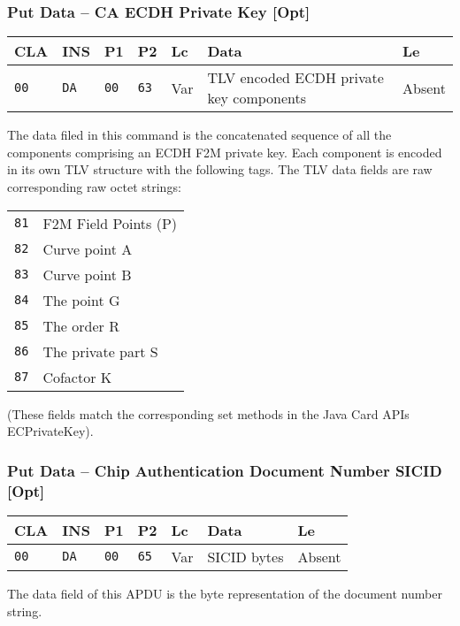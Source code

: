 \documentclass{article}
\begin{document}
\subsubsection{Put Data -- CA ECDH Private Key [Opt]}

\begin{flushleft}
\begin{tabular}{|l|l|l|l|l|l|l|}
\hline
CLA & INS & P1 & P2 & Lc & Data & Le \\
\hline
\texttt{00} & \texttt{DA} & \texttt{00} & \texttt{63} &
Var & TLV encoded ECDH private key components & Absent \\
\hline
\end{tabular}
\end{flushleft}
The data filed in this command is the concatenated sequence of all the
components comprising an ECDH F2M private key.  Each component is
encoded in its own TLV structure with the following tags. The TLV data
fields are raw corresponding raw octet strings:
\begin{flushleft}
\begin{tabular}{|l|l|}
\hline
\texttt{81} & F2M Field Points (P)\\
\texttt{82} & Curve point A \\
\texttt{83} & Curve point B\\
\texttt{84} & The point G\\
\texttt{85} & The order R\\
\texttt{86} & The private part S\\
\texttt{87} & Cofactor K\\
\hline
\end{tabular}
\end{flushleft}
(These fields match the corresponding set methods in the Java Card
APIs ECPrivateKey).

\subsubsection{Put Data -- Chip Authentication Document Number SICID [Opt]}

\begin{flushleft}
\begin{tabular}{|l|l|l|l|l|l|l|}
\hline CLA & INS & P1 & P2 & Lc & Data & Le \\
\hline \texttt{00} & \texttt{DA} & \texttt{00} & \texttt{65} &
Var & SICID bytes &
Absent \\
\hline
\end{tabular}
\end{flushleft}
The data field of this APDU is the byte representation of the document
number string.
\end{document}
